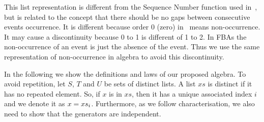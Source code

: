 \documentclass[12pt,openright,twoside,a4paper,oldfontcommands,english,brazil,final]{abntex2}
\theoremstyle{theo}
\newcommand{\nth}[2]{\ensuremath #1_{#2}}
\def\algebraset{\ensuremath\operatorname{\mathbf{atf}}}
\begin{document}
This list representation is different from the Sequence Number function used in~\cite{WP2009,Walker2009}, but is related to the concept that there should be no gaps between consecutive events occurrence.
It is different because order 0 (zero) in~\cite{WP2009,Walker2009} means non-occurrence.
It may cause a discontinuity because 0 to 1 is different of 1 to 2.
In \acp{FBA} the non-occurrence of an event is just the absence of the event.
Thus we use the same representation of non-occurrence in \ac{algebra} to avoid this discontinuity.







In the following we show the definitions and laws of our proposed \ac{algebra}.
To avoid repetition, let $S$, $T$ and $U$ be sets of distinct lists.
A list $xs$ is distinct if it has no repeated element.
So, if $x$ is in $xs$, then it has a unique associated index $i$ and we denote it as $x = \nth{xs}{i}$.
Furthermore, as we follow  characterisation, we also need to show that the generators are independent.
\end{document}
